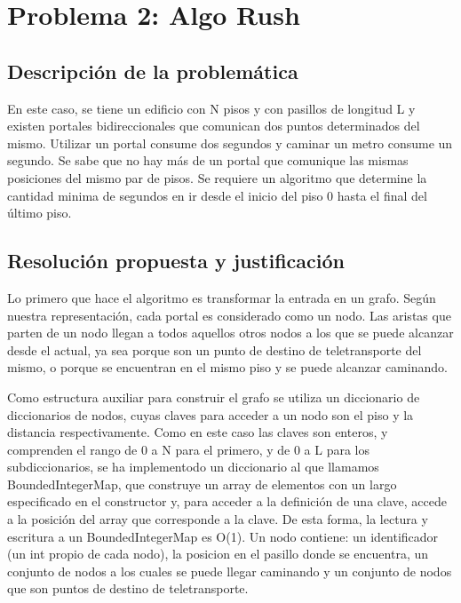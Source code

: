 \section{Problema 2: Algo Rush}

\subsection{Descripción de la problemática}
En este caso, se tiene un edificio con N pisos y con pasillos de longitud L y existen portales bidireccionales que comunican dos puntos determinados del mismo. Utilizar un portal consume dos segundos y caminar un metro consume un segundo. Se sabe que no hay más de un portal que comunique las mismas posiciones del mismo par de pisos.
Se requiere un algoritmo que determine la cantidad minima de segundos en ir desde el inicio del piso 0 hasta el final del último piso.

\subsection{Resolución propuesta y justificación}
Lo primero que hace el algoritmo es transformar la entrada en un grafo. Según nuestra representación, cada portal es considerado como un nodo. Las aristas que parten de un nodo llegan a todos aquellos otros nodos a los que se puede alcanzar desde el actual, ya sea porque son un punto de destino de teletransporte del mismo, o porque se encuentran en el mismo piso y se puede alcanzar caminando.

Como estructura auxiliar para construir el grafo se utiliza un diccionario de diccionarios de nodos, cuyas claves para acceder a un nodo son el piso y la distancia respectivamente. Como en este caso las claves son enteros, y comprenden el rango de 0 a N para el primero, y de 0 a L para los subdiccionarios, se ha implementodo un diccionario al que llamamos BoundedIntegerMap, que construye un array de elementos con un largo especificado en el constructor y, para acceder a la definición de una clave, accede a la posición del array que corresponde a la clave. De esta forma, la lectura y escritura a un BoundedIntegerMap es O(1).
Un nodo contiene: un identificador (un int propio de cada nodo), la posicion en el pasillo donde se encuentra, un conjunto de nodos a los cuales se puede llegar caminando y un conjunto de nodos que son puntos de destino de teletransporte.

